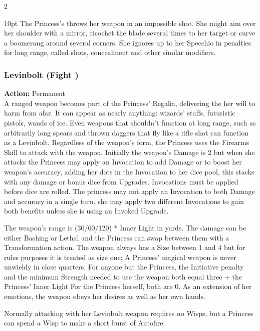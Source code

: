 \begin{multicols}{2}
\begin{myindentpar}{10pt}
The Princess's throws her weapon in an impossible shot. She might aim over her shoulder with a mirror, ricochet the blade several times to her target or curve a boomerang around several corners. She ignores up to her Specchio in penalties for long range, called shots, concealment and other similar modifiers.

\end{myindentpar}

\subsubsection*{Levinbolt (Fight \textbullet)}

\noindent \textbf{Action:} Permanent\\

\noindent A ranged weapon becomes part of the Princess’ Regalia, delivering the her will to harm from afar. It can appear as nearly anything: wizards’ staffs, futuristic pistols, wands of ice. Even weapons that shouldn't function at long range, such as arbitrarily long spears and thrown daggers that fly like a rifle shot can function as a Levinbolt. Regardless of the weapon's form, the Princess uses the Firearms Skill to attack with the weapon. Initially the weapon's Damage is 2 but when she attacks the Princess may apply an Invocation to add Damage or to boost her weapon's accuracy, adding her dots in the Invocation to her dice pool, this stacks with any damage or bonus dice from Upgrades. Invocations must be applied before dice are rolled. The princess may not apply an Invocation to both Damage and accuracy in a single turn, she may apply two different Invocations to gain both benefits unless she is using an Invoked Upgrade.  

The weapon’s range is (30/60/120) * Inner Light in yards. The damage can be either Bashing or Lethal and the Princess can swap between them with a Transformation action. The weapon always has a Size between 1 and 4 but for rules purposes it is treated as size one; A Princess' magical weapon is never unwieldy in close quarters. For anyone but the Princess, the Initiative penalty and the minimum Strength needed to use the weapon both equal three + the Princess' Inner Light For the Princess herself, both are 0. As an extension of her emotions, the weapon obeys her desires as well as her own hands.

Normally attacking with her Levinbolt weapon requires no Wisps, but a Princess can spend a Wisp to make a short burst of Autofire.


\end{multicols}
